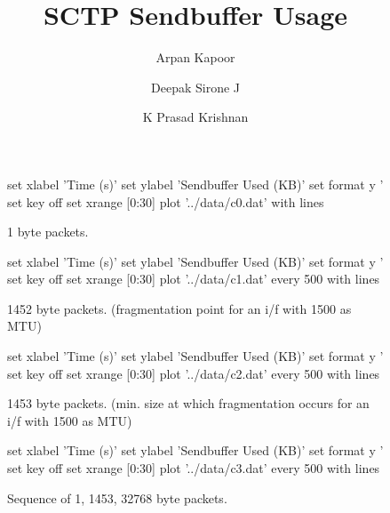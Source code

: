 \documentclass[a4paper,11pt]{article}
\title{SCTP Sendbuffer Usage}
\author{Arpan Kapoor \and Deepak Sirone J \and K Prasad Krishnan}
\date{}
\begin{document}
\maketitle
\listoffigures

\begin{figure}
	\centering
	\begin{gnuplot}[terminal=cairolatex,
		terminaloptions={size \convertlen{0.95\linewidth},
			\convertlen{0.95\textheight}}]
		set xlabel 'Time (s)'
		set ylabel 'Sendbuffer Used (KB)\vspace{0.5cm}'
		set format y '%
		set key off
		set xrange [0:30]
		plot '../data/c0.dat' with lines
	\end{gnuplot}
	\caption{1 byte packets.}
\end{figure}

\begin{figure}
	\centering
	\begin{gnuplot}[terminal=cairolatex,
		terminaloptions={size \convertlen{0.95\linewidth},
			\convertlen{0.95\textheight}}]
		set xlabel 'Time (s)'
		set ylabel 'Sendbuffer Used (KB)\vspace{0.5cm}'
		set format y '%
		set key off
		set xrange [0:30]
		plot '../data/c1.dat' every 500 with lines
	\end{gnuplot}
	\caption{1452 byte packets.
		(fragmentation point for an i/f with 1500 as MTU)}
\end{figure}

\begin{figure}
	\centering
	\begin{gnuplot}[terminal=cairolatex,
		terminaloptions={size \convertlen{0.95\linewidth},
			\convertlen{0.95\textheight}}]
		set xlabel 'Time (s)'
		set ylabel 'Sendbuffer Used (KB)\vspace{0.5cm}'
		set format y '%
		set key off
		set xrange [0:30]
		plot '../data/c2.dat' every 500 with lines
	\end{gnuplot}
	\caption{1453 byte packets.
		(min. size at which fragmentation occurs
		for an i/f with 1500 as MTU)}
\end{figure}

\begin{figure}
	\centering
	\begin{gnuplot}[terminal=cairolatex,
		terminaloptions={size \convertlen{0.95\linewidth},
			\convertlen{0.95\textheight}}]
		set xlabel 'Time (s)'
		set ylabel 'Sendbuffer Used (KB)\vspace{0.5cm}'
		set format y '%
		set key off
		set xrange [0:30]
		plot '../data/c3.dat' every 500 with lines
	\end{gnuplot}
	\caption{Sequence of 1, 1453, 32768 byte packets.}
\end{figure}
\end{document}
